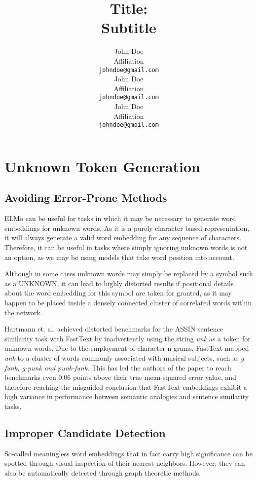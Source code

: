 \documentclass[11pt,a4paper]{article}
\title{Title: \\Subtitle}
\author{
  John Doe \\
  Affiliation\\
  \texttt{johndoe@gmail.com} \\
  \And
  John Doe \\
  Affiliation\\
  \texttt{johndoe@gmail.com} \\
  \And
  John Doe \\
  Affiliation\\
  \texttt{johndoe@gmail.com} \\
}
\date{}
\newcommand{\1}{\boldsymbol{1}}
\begin{document}
\maketitle

\section{Unknown Token Generation}  

\subsection{Avoiding Error-Prone Methods}

ELMo can be useful for tasks in which it may be necessary to generate word embeddings for unknown words. As it is a purely character based representation, it will always generate a valid word embedding for any sequence of characters. Therefore, it can be useful in tasks where simply ignoring unknown words is not an option, as we may be using models that take word position into account.

Although in some cases unknown words may simply be replaced by a symbol such as a UNKNOWN, it can lead to highly distorted results if positional details about the word embedding for this symbol are taken for granted, as it may happen to be placed inside a densely connected cluster of correlated words within the network. 

Hartmann et. al. \cite{hartmann2017portuguese} achieved distorted benchmarks for the ASSIN sentence similarity task with FastText by inadvertently using the string \textit{unk} as a token for unknown words. Due to the employment of character n-grams, FastText mapped \textit{unk} to a cluster of words commonly associated with musical subjects, such as \textit{g-funk, g-punk and punk-funk}. This has led the authors of the paper to reach benchmarks even 0.06 points above their true mean-squared error value, and therefore reaching the misguided conclusion that FastText embeddings exhibit a high variance in performance between semantic analogies and sentence similarity tasks.

\subsection{Improper Candidate Detection}


So-called meaningless word embeddings that in fact carry high significance can be spotted through visual inspection of their nearest neighbors. However, they can also be automatically detected through graph theoretic methods. 
\end{document}

